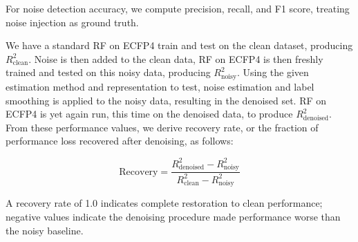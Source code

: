 For noise detection accuracy, we compute precision, recall, and F1 score, treating noise injection as ground truth.

We have a standard RF on ECFP4 train and test on the clean dataset, producing $R^2_{\text{clean}}$. Noise is then added to the clean data, RF on ECFP4 is then freshly trained and tested on this noisy data, producing $R^2_{\text{noisy}}$. Using the given estimation method and representation to test, noise estimation and label smoothing is applied to the noisy data, resulting in the denoised set. RF on ECFP4 is yet again run, this time on the denoised data, to produce $R^2_{\text{denoised}}$. From these performance values, we derive recovery rate, or the fraction of performance loss recovered after denoising, as follows: 

$$
\text{Recovery} = \frac{R^2_{\text{denoised}} - R^2_{\text{noisy}}}{R^2_{\text{clean}} - R^2_{\text{noisy}}}
$$

A recovery rate of 1.0 indicates complete restoration to clean performance; negative values indicate the denoising procedure made performance worse than the noisy baseline.



